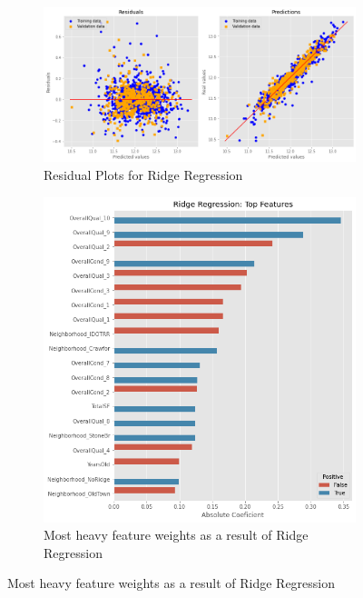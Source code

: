 \documentclass{article}
\begin{document}
	\begin{figure}[h!]
		\centering
		\begin{subfigure}[b]{0.4\linewidth}
		  \includegraphics[width=\linewidth]{ridgeplot}
		  \caption{Residual Plots for Ridge Regression}
		\end{subfigure}
		\begin{subfigure}[b]{0.4\linewidth}
		  \includegraphics[width=\linewidth]{ridgefeat}
		  \caption{Most heavy feature weights as a result of Ridge Regression}
		\end{subfigure}
		\label{fig:correlation}
	  \end{figure}
	  
\end{document}
